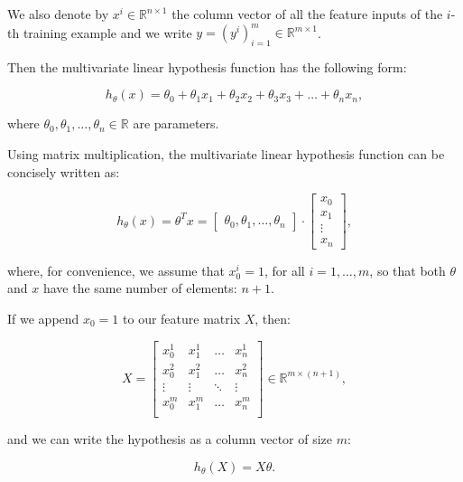 \documentclass[a4paper,11pt]{report}
\begin{document}
We also denote by $x^{i}\in\mathbb{R}^{n\times 1}$ the column vector of all the feature inputs of the $i$-th training example and we write $y = (y^i)_{i=1}^{m}\in\mathbb{R}^{m\times 1}$.

Then the multivariate linear hypothesis function has the following form:

\begin{equation}\label{eq:mul-reg-hyp}
h_\theta (x) = \theta_0 + \theta_1 x_1 + \theta_2 x_2 + \theta_3 x_3 + \ldots + \theta_n x_n,
\end{equation}

where $\theta_0, \theta_1, \ldots, \theta_n \in \mathbb{R}$ are parameters.

Using matrix multiplication, the multivariate linear hypothesis function can be concisely written as:

\begin{equation}\label{eq:mul-reg-hyp-vec}
h_\theta(x) = \theta^T x = \begin{bmatrix}\theta_0, \theta_1,\ldots, \theta_n \end{bmatrix} \cdot \begin{bmatrix}x_0 \\ x_1 \\ \vdots \\ x_n \end{bmatrix},
\end{equation}

where, for convenience, we assume that $x^i_0 = 1$, for all $i= 1, \ldots, m$, so that both $\theta$ and $x$ have the same number of elements: $n+1$.

If we append $x_0 = 1$ to our feature matrix $X$, then:

\begin{equation*}
X = \begin{bmatrix}
x^{1}_0 & x^{1}_1 & \ldots & x^{1}_n  \\
x^{2}_0 & x^{2}_1 & \ldots & x^{2}_n  \\
\vdots  & \vdots  & \ddots & \vdots \\
x^{m}_0 & x^{m}_1 & \ldots & x^{m}_n  \\
\end{bmatrix}\in\mathbb{R}^{m \times (n+1)},
\end{equation*}

and we can write the hypothesis as a column vector of size $m$:

\begin{equation}\label{eq:mul-reg-hyp-mat}
h_\theta(X) = X \theta .
\end{equation}
\end{document}
